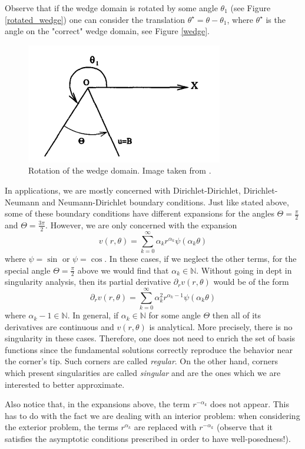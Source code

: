 \begin{remark}
    Observe that if the wedge domain is rotated by some angle \(\theta_1\) (see Figure \eqref{rotated_wedge}) one can consider the translation \(\theta^\star = \theta - \theta_1\), where \(\theta^\star\) is the angle on the "correct" wedge domain, see Figure \eqref{wedge}. 
    \begin{figure}[H]
        \centering
        \includegraphics[scale=0.5]{Images/rotated_wedge.png}
        \caption{Rotation of the wedge domain. Image taken from \cite{li2000singularities}.}
        \label{rotated_wedge}
    \end{figure}
    In applications, we are mostly concerned with Dirichlet-Dirichlet, Dirichlet-Neumann and Neumann-Dirichlet boundary conditions. Just like stated above, some of these boundary conditions have different expansions for the angles \(\Theta=\frac{\pi}{2}\) and \(\Theta=\frac{3\pi}{2}\). However, we are only concerned with the expansion
    \[
        v(r,\theta) = \sum_{k=0}^{\infty}\alpha_k r^{\alpha_k}\psi(\alpha_k \theta)
    \]
    where \(\psi=\sin\) or \(\psi = \cos\). In these cases, if we neglect the other terms, for the special angle \(\Theta = \frac{\pi}{2}\) above we would find that \(\alpha_k \in \mathbb{N}\). Without going in dept in singularity analysis, then its partial derivative \(\partial_r v(r,\theta)\) would be of the form 
    \[
        \partial_r v(r,\theta) = \sum_{k=0}^{\infty}\alpha_k^2 r^{\alpha_k-1}\psi(\alpha_k \theta)
    \]
    where \(\alpha_k-1 \in \mathbb{N}\). In general, if \(\alpha_k \in \mathbb{N}\) for some angle \(\Theta\) then all of its derivatives are continuous and \(v(r,\theta)\) is analytical. More precisely, there is no singularity in these cases. Therefore, one does not need to enrich the set of basis functions since the fundamental solutions correctly reproduce the behavior near the corner's tip. Such corners are called \textit{regular}. On the other hand, corners which present singularities are called \textit{singular} and are the ones which we are interested to better approximate. 

    Also notice that, in the expansions above, the term \(r^{-\alpha_k}\) does not appear. This has to do with the fact we are dealing with an interior problem: when considering the exterior problem, the terms \(r^{\alpha_k}\) are replaced with \(r^{-\alpha_k}\) (observe that it satisfies the asymptotic conditions prescribed in order to have well-posedness!).
\end{remark}

